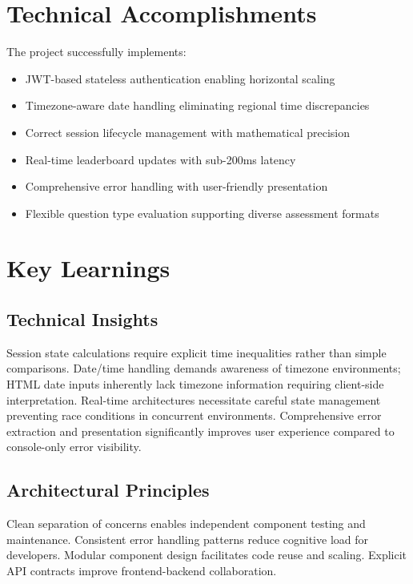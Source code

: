 \documentclass[12pt,a4paper]{report}
\begin{document}
\section{Technical Accomplishments}

The project successfully implements:

\begin{itemize}[left=0pt]
  \item JWT-based stateless authentication enabling horizontal scaling
  \item Timezone-aware date handling eliminating regional time discrepancies
  \item Correct session lifecycle management with mathematical precision
  \item Real-time leaderboard updates with sub-200ms latency
  \item Comprehensive error handling with user-friendly presentation
  \item Flexible question type evaluation supporting diverse assessment formats
\end{itemize}

\section{Key Learnings}

\subsection{Technical Insights}

Session state calculations require explicit time inequalities rather than simple comparisons. Date/time handling demands awareness of timezone environments; HTML date inputs inherently lack timezone information requiring client-side interpretation. Real-time architectures necessitate careful state management preventing race conditions in concurrent environments. Comprehensive error extraction and presentation significantly improves user experience compared to console-only error visibility.

\subsection{Architectural Principles}

Clean separation of concerns enables independent component testing and maintenance. Consistent error handling patterns reduce cognitive load for developers. Modular component design facilitates code reuse and scaling. Explicit API contracts improve frontend-backend collaboration.
\end{document}
